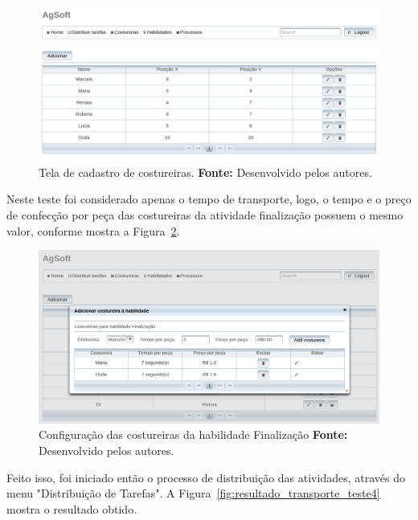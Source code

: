 \begin{figure}[h!]
	\centerline{\includegraphics[width=14.7cm]{./imagens/posicao_xy_costureiras_teste4.png}}
	\caption[Tela de cadastro de costureiras.]
	{Tela de cadastro de costureiras. \textbf{Fonte:} Desenvolvido pelos autores.}
	\label{fig:add_xy_costureira_teste4}
\end{figure}


\par Neste teste foi considerado apenas o tempo de transporte, logo, o tempo e o
preço de confecção por peça das costureiras da atividade finalização possuem o
mesmo valor, conforme mostra a Figura~\ref{fig:at_finalizacao_teste4}.


\begin{figure}[h!]
	\centerline{\includegraphics[width=14cm]{./imagens/cofig_at_finalizaca_teste4.png}}
	\caption[Configuração das costureiras da habilidade Finalização.]
	{Configuração das costureiras da habilidade Finalização \textbf{Fonte:}
	Desenvolvido pelos autores.}
	\label{fig:at_finalizacao_teste4}
\end{figure}



\par Feito isso, foi iniciado então o processo de distribuição das atividades,
através do menu "Distribuição de Tarefas". A Figura~\ref{fig:resultado_transporte_teste4} mostra o resultado obtido.

